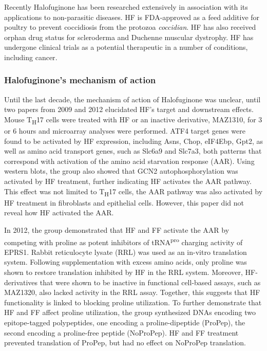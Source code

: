 Recently Halofuginone has been researched extensively in association with its applications to non-parasitic diseases.
HF is FDA-approved as a feed additive for poultry to prevent coccidiosis from the protozoa \textit{coccidian}.
HF has also received orphan drug status for scleroderma and Duchenne muscular dystrophy.
HF has undergone clinical trials as a potential therapeutic in a number of conditions, including cancer\cite{halo2012clin, halo2012clin2}.

\subsubsection{Halofuginone's mechanism of action}

Until the last decade, the mechanism of action of Halofuginone was unclear, until two papers from 2009\cite{sundrud2009halofuginone} and 2012\cite{keller2012halofuginone} elucidated HF's target and downstream effects.
Mouse T\textsubscript{H}17 cells were treated with HF or an inactive derivative, MAZ1310, for 3 or 6 hours and microarray analyses were performed.
ATF4 target genes were found to be activated by HF expression, including Asns, Chop, eIF4Ebp, Gpt2, as well as amino acid transport genes, such as Slc6a9 and Slc7a3, both patterns that correspond with activation of the amino acid starvation response (AAR).
Using western blots, the group also showed that GCN2 autophosphorylation was activated by HF treatment, further indicating HF activates the AAR pathway.
This effect was not limited to T\textsubscript{H}17 cells, the AAR pathway was also activated by HF treatment in fibroblasts and epithelial cells\cite{sundrud2009halofuginone}.
However, this paper did not reveal how HF activated the AAR.

In 2012, the group demonstrated that HF and FF activate the AAR by competing with proline as potent inhibitors of tRNA\textsuperscript{pro} charging activity of EPRS1.
Rabbit reticulocyte lysate (RRL) was used as an in-vitro translation system.
Following supplementation with excess amino acids, only proline was shown to restore translation inhibited by HF in the RRL system.
Moreover, HF-derivatives that were shown to be inactive in functional cell-based assays, such as MAZ1320, also lacked activity in the RRL assay.
Together, this suggests that HF functionality is linked to blocking proline utilization.
To further demonstrate that HF and FF affect proline utilization, the group synthesized DNAs encoding two epitope-tagged polypeptides, one encoding a proline-dipeptide (ProPep), the second encoding a proline-free peptide (NoProPep).
HF and FF treatment prevented translation of ProPep, but had no effect on NoProPep translation\cite{keller2012halofuginone}.

